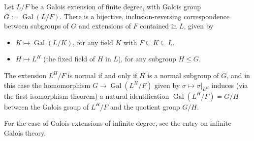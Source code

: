 \documentclass{article}
\begin{document}
Let $L/F$ be a Galois extension of finite degree,
with Galois group $G := \operatorname{Gal}(L/F)$.
There is a bijective, inclusion-reversing correspondence
between subgroups of $G$ and extensions of $F$ contained in $L$, given by
\begin{itemize}
\item $K \mapsto \operatorname{Gal}(L/K)$,
       for any field $K$ with $F \subseteq K \subseteq L$.
\item $H \mapsto L^H$ (the fixed field of $H$ in $L$),
       for any subgroup $H \leq G$.
\end{itemize}
The extension $L^H/F$ is normal if and only if $H$ is a normal subgroup of $G$,
and in this case the homomorphism $G \longrightarrow \operatorname{Gal}(L^H/F)$
given by $\sigma \mapsto \sigma|_{L^H}$
induces (via the first isomorphism theorem)
a natural identification $\operatorname{Gal}(L^H/F) = G/H$
between the Galois group of $L^H/F$ and the quotient group $G/H$.

For the case of Galois extensions of infinite degree,
see the entry on infinite Galois theory.
\end{document}
